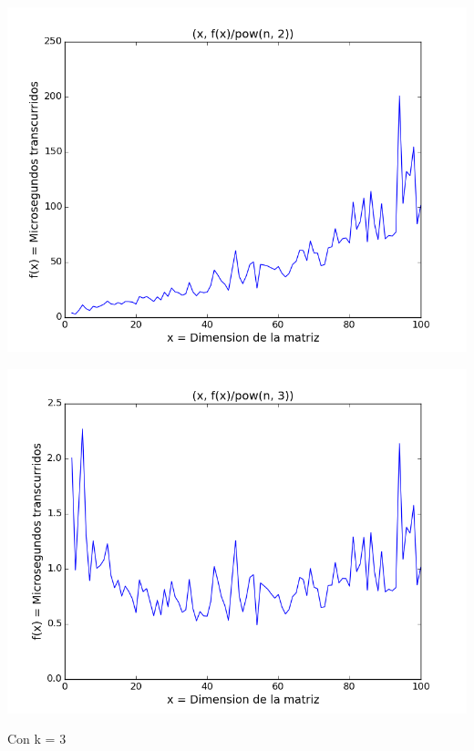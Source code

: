 \begin{center}
\includegraphics[scale=0.54]{images/2potenciasobrecuadrado}
\end{center}


\begin{center}
\includegraphics[scale=0.54]{images/2potenciasobrecubo}
\end{center}


\vspace{2mm}

Con k = 3


